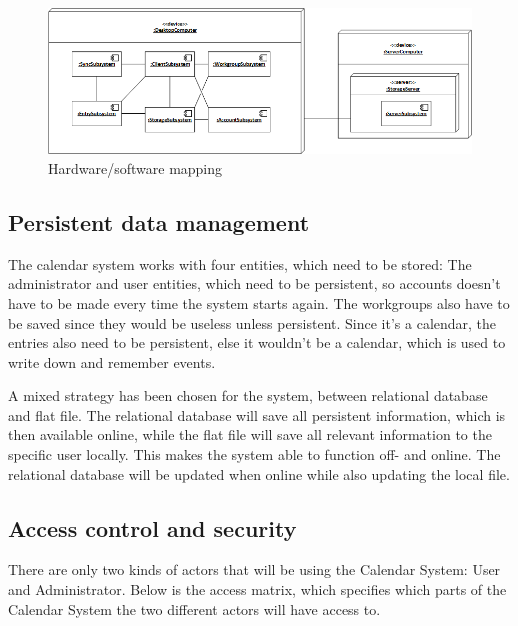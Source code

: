 \begin{figure}[h]
\centering
\includegraphics[scale = 0.7]{deployment}
\caption{Hardware/software mapping}
\end{figure}

\subsection{Persistent data management}

The calendar system works with four entities, which need to be stored: The administrator and user entities, which need to be persistent, so accounts  doesn’t have to be made every time the system starts again. The workgroups also have to be saved since they would be useless unless persistent.
	Since it’s a calendar, the entries also need to be persistent, else it wouldn’t be a calendar, which is used to write down and remember events.

A mixed strategy has been chosen for the system, between relational database and flat file. The relational database will save all persistent information, which is then available online, while the flat file will save all relevant information to the specific user locally.
	This makes the system able to function off- and online. The relational database will be updated when online while also updating the local file.
\subsection{Access control and security}
There are only two kinds of actors that will be using the Calendar System: User and Administrator. Below is the access matrix, which specifies which parts of the Calendar System the two different actors will have access to.

